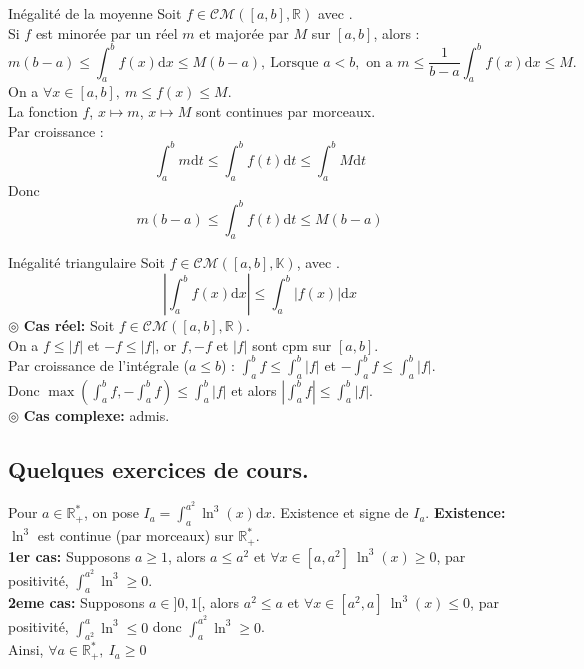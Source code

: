 \documentclass[11pt]{article}
\newcommand*{\K}{\mathbb{K}}
\newcommand*{\R}{\mathbb{R}}
\newcommand*{\CM}{\mathcal{CM}}
\newcommand{\0}{\varnothing}
\newcommand{\dx}{\textrm{d}x}
\newcommand{\dt}{\textrm{d}t}
\begin{document}
\begin{prop}{Inégalité de la moyenne}{}
    Soit $f\in\CM([a,b], \R)$ avec .\\
    Si $f$ est minorée par un réel $m$ et majorée par $M$ sur $[a,b]$, alors :
    \begin{equation*}
        m(b-a) \leq \int_a^bf(x)\dx \leq M(b-a),~\text{Lorsque }a<b, \text{ on a } m\leq\frac{1}{b-a}\int_a^bf(x)\dx\leq M.
    \end{equation*}
    \tcblower
    On a $\forall x\in[a,b], ~ m \leq f(x) \leq M$.\\
    La fonction $f$, $x\mapsto m$, $x\mapsto M$ sont continues par morceaux.\\
    Par croissance :
    \begin{equation*}
        \int_a^bm\dt\leq \int_a^bf(t)\dt\leq\int_a^bM\dt
    \end{equation*}
    Donc
    \begin{equation*}
        m(b-a) \leq \int_a^bf(t)\dt\leq M(b-a)
    \end{equation*}
\end{prop}

\begin{prop}{Inégalité triangulaire}{}
    Soit $f\in\CM([a,b], \K)$, avec .
    \begin{equation*}
        \left|\int_a^bf(x)\dx\right|\leq\int_a^b|f(x)|\dx
    \end{equation*}
    \tcblower
    $\circledcirc$ \textbf{Cas réel:} Soit $f\in\CM([a,b], \R)$.\\
    On a $f\leq|f|$ et $-f\leq|f|$, or $f, -f$ et $|f|$ sont cpm sur $[a,b]$.\\
    Par croissance de l'intégrale ($a\leq b$) : $\int_a^b f \leq \int_a^b|f|$ et $-\int_a^bf \leq\int_a^b|f|$.\\
    Donc $\max(\int_a^b f, -\int_a^b f) \leq \int_a^b|f|$ et alors $\left|\int_a^b f\right|\leq\int_a^b|f|$.\\
    $\circledcirc$ \textbf{Cas complexe:} admis.
\end{prop}

\subsection{Quelques exercices de cours.}

\begin{ex}{}{}
    Pour $a\in\R^*_+$, on pose $I_a=\int_a^{a^2}\ln^3(x)\dx$. Existence et signe de $I_a$.
    \tcblower
    \textbf{Existence:} $\ln^3$ est continue (par morceaux) sur $\R^*_+$.\\
    \textbf{1er cas:} Supposons $a\geq1$, alors $a\leq a^2$ et $\forall x \in [a,a^2] ~ \ln^3(x) \geq 0$, par positivité, $\int_a^{a^2}\ln^3\geq0$.\\
    \textbf{2eme cas:} Supposons $a\in]0,1[$, alors $a^2\leq a$ et $\forall x \in [a^2, a] ~ \ln^3(x)\leq0$, par positivité, $\int_{a^2}^a\ln^3\leq0$ donc $\int_a^{a^2}\ln^3\geq0$.\\
    Ainsi, $\forall a\in\R^*_+, ~ I_a\geq0$
\end{ex}
\end{document}
